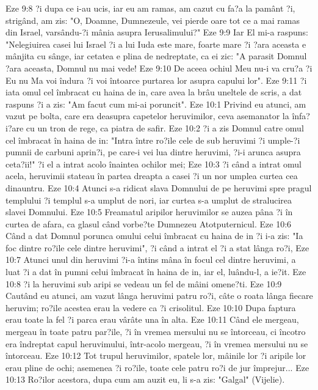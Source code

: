 Eze 9:8  ?i dupa ce i-au ucis, iar eu am ramas, am cazut cu fa?a la pamânt ?i, strigând, am zis: "O, Doamne, Dumnezeule, vei pierde oare tot ce a mai ramas din Israel, varsându-?i mânia asupra Ierusalimului?"
Eze 9:9  Iar El mi-a raspuns: "Nelegiuirea casei lui Israel ?i a lui Iuda este mare, foarte mare ?i ?ara aceasta e mânjita cu sânge, iar cetatea e plina de nedreptate, ca ei zic: "A parasit Domnul ?ara aceasta, Domnul nu mai vede!
Eze 9:10  De aceea ochiul Meu nu-i va cru?a ?i Eu nu Ma voi îndura ?i voi întoarce purtarea lor asupra capului lor".
Eze 9:11  ?i iata omul cel îmbracat cu haina de in, care avea la brâu uneltele de scris, a dat raspuns ?i a zis: "Am facut cum mi-ai poruncit".
Eze 10:1  Privind eu atunci, am vazut pe bolta, care era deasupra capetelor heruvimilor, ceva asemanator la înfa?i?are cu un tron de rege, ca piatra de safir.
Eze 10:2  ?i a zis Domnul catre omul cel îmbracat în haina de in: "Intra între ro?ile cele de sub heruvimi ?i umple-?i pumnii de carbuni aprin?i, pe care-i vei lua dintre heruvimi, ?i-i arunca asupra ceta?ii!" ?i el a intrat acolo înaintea ochilor mei;
Eze 10:3  ?i când a intrat omul acela, heruvimii stateau în partea dreapta a casei ?i un nor umplea curtea cea dinauntru.
Eze 10:4  Atunci s-a ridicat slava Domnului de pe heruvimi spre pragul templului ?i templul s-a umplut de nori, iar curtea s-a umplut de stralucirea slavei Domnului.
Eze 10:5  Freamatul aripilor heruvimilor se auzea pâna ?i în curtea de afara, ca glasul când vorbe?te Dumnezeu Atotputernicul.
Eze 10:6  Când a dat Domnul porunca omului celui îmbracat cu haina de in ?i i-a zis: "Ia foc dintre ro?ile cele dintre heruvimi", ?i când a intrat el ?i a stat lânga ro?i,
Eze 10:7  Atunci unul din heruvimi ?i-a întins mâna în focul cel dintre heruvimi, a luat ?i a dat în pumni celui îmbracat în haina de in, iar el, luându-l, a ie?it.
Eze 10:8  ?i la heruvimi sub aripi se vedeau un fel de mâini omene?ti.
Eze 10:9  Cautând eu atunci, am vazut lânga heruvimi patru ro?i, câte o roata lânga fiecare heruvim; ro?ile acestea erau la vedere ca ?i crisolitul.
Eze 10:10  Dupa faptura erau toate la fel ?i parca erau vârâte una în alta.
Eze 10:11  Când ele mergeau, mergeau în toate patru par?ile, ?i în vremea mersului nu se întorceau, ci încotro era îndreptat capul heruvimului, într-acolo mergeau, ?i în vremea mersului nu se întorceau.
Eze 10:12  Tot trupul heruvimilor, spatele lor, mâinile lor ?i aripile lor erau pline de ochi; asemenea ?i ro?ile, toate cele patru ro?i de jur împrejur...
Eze 10:13  Ro?ilor acestora, dupa cum am auzit eu, li s-a zis: "Galgal" (Vijelie).
